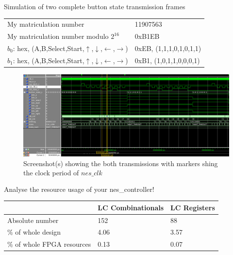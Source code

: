 \documentclass[10pt,a4paper,titlepage,oneside]{article}
\begin{document}
\begin{qa}{Simulation of two complete button state transmission frames}

\begin{center}
\begin{tabular}{ll}
\hline\hline
My matriculation number                   &  11907563 \\
My matriculation number modulo $2^{16}$   & 0xB1EB \\
$b_0$: hex, ({A},{B},{Select},{Start},{$\uparrow$},{$\downarrow$},{$\leftarrow$},{$\rightarrow$})  & 0xEB, (1,1,1,0,1,0,1,1) \\
$b_1$: hex, ({A},{B},{Select},{Start},{$\uparrow$},{$\downarrow$},{$\leftarrow$},{$\rightarrow$})  & 0xB1, (1,0,1,1,0,0,0,1) \\\hline
\end{tabular}
\end{center}

\begin{figure}[h!]
	\centering
	\includegraphics[width=1.0\linewidth]{dia/Subtask9.png}
	\caption{Screenshot(s) showing the both transmissions with markers shing the clock period of $nes\_clk$}
\end{figure}

\end{qa}


\begin{qa}{Analyse the resource usage of your \textsf{nes\_controller}!}
\centering
\begin{tabular}{l|ll}
	\hline
		                       & LC Combinationals  & LC Registers  \\ \hline\hline 
	Absolute number            & 152                & 88            \\
	\% of whole design         & 4.06               & 3.57          \\ 
	\% of whole FPGA resources & 0.13               & 0.07          \\ \hline
\end{tabular}
\end{qa}
\end{document}
